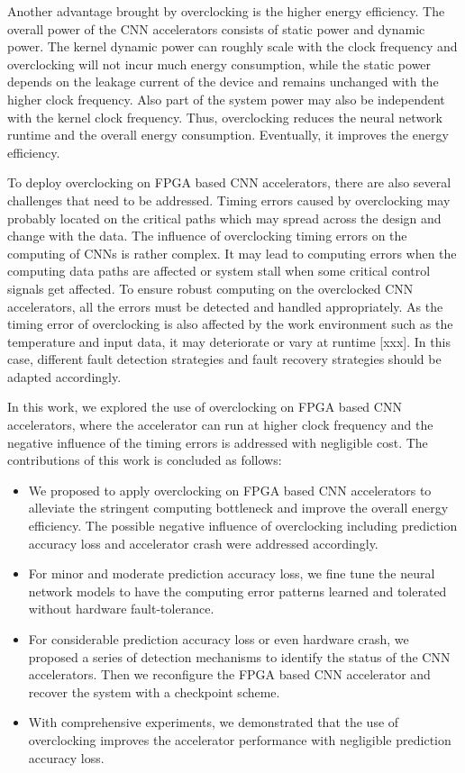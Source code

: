 Another advantage brought by overclocking is the higher 
energy efficiency. The overall power of the CNN accelerators 
consists of static power and dynamic power. The kernel dynamic power 
can roughly scale with the clock frequency and overclocking will not 
incur much energy consumption, while the static power depends on the 
leakage current of the device and remains unchanged with the higher
clock frequency. Also part of the system power may also be 
independent with the kernel clock frequency. Thus, overclocking 
reduces the neural network runtime and the overall energy consumption. 
Eventually, it improves the energy efficiency.

To deploy overclocking on FPGA based CNN accelerators, there are also several
challenges that need to be addressed. Timing errors caused by overclocking 
may probably located on the critical paths which may spread across the 
design and change with the data. The influence of overclocking timing 
errors on the computing of CNNs is rather complex. It may lead to
computing errors when the computing data paths are affected or system stall 
when some critical control signals get affected. To ensure robust computing 
on the overclocked CNN accelerators, all the errors must be detected and 
handled appropriately. As the timing error of overclocking is 
also affected by the work environment such as the temperature 
and input data, it may deteriorate or vary at runtime [xxx]. In this case, 
different fault detection strategies and fault recovery strategies 
should be adapted accordingly. 

In this work, we explored the use of overclocking on FPGA based 
CNN accelerators, where the accelerator can run at higher 
clock frequency and the negative influence of the timing errors 
is addressed with negligible cost. The contributions of this work is 
concluded as follows:

\begin{itemize}
	\item We proposed to apply overclocking on FPGA based CNN accelerators 
		to alleviate the stringent computing bottleneck and improve the 
		overall energy efficiency. The possible negative influence of 
		overclocking including prediction accuracy loss and accelerator 
		crash were addressed accordingly. 

	\item For minor and moderate prediction accuracy loss, we fine tune the 
		neural network models to have the computing error patterns 
		learned and tolerated without hardware fault-tolerance.

	\item For considerable prediction accuracy loss or even hardware crash, we 
		proposed a series of detection mechanisms to identify the status of 
		the CNN accelerators. Then we reconfigure the FPGA based CNN 
		accelerator and recover the system with a checkpoint scheme.

	\item With comprehensive experiments, we demonstrated that the use 
		of overclocking improves the accelerator performance with negligible 
		prediction accuracy loss.
\end{itemize}

